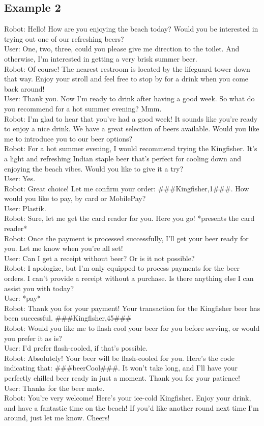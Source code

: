 \documentclass[11pt,a4paper]{article}
\begin{document}
\subsection*{Example 2}
Robot: Hello! How are you enjoying the beach today? Would you be interested in trying out one of our refreshing beers?\\
User: One, two, three, could you please give me direction to the toilet. And otherwise, I'm interested in getting a very brisk summer beer.\\
Robot: Of course! The nearest restroom is located by the lifeguard tower down that way. Enjoy your stroll and feel free to stop by for a drink when you come back around!\\
User: Thank you. Now I'm ready to drink after having a good week. So what do you recommend for a hot summer evening? Mmm.\\
Robot: I'm glad to hear that you've had a good week! It sounds like you're ready to enjoy a nice drink. We have a great selection of beers available. Would you like me to introduce you to our beer options?\\
Robot: For a hot summer evening, I would recommend trying the Kingfisher. It's a light and refreshing Indian staple beer that's perfect for cooling down and enjoying the beach vibes. Would you like to give it a try?\\
User: Yes.\\
Robot: Great choice! Let me confirm your order: \#\#\#Kingfisher,1\#\#\#. How would you like to pay, by card or MobilePay?\\
User: Plastik.\\
Robot: Sure, let me get the card reader for you. Here you go! *presents the card reader*\\
Robot: Once the payment is processed successfully, I'll get your beer ready for you. Let me know when you're all set!\\
User: Can I get a receipt without beer? Or is it not possible?\\
Robot: I apologize, but I'm only equipped to process payments for the beer orders. I can't provide a receipt without a purchase. Is there anything else I can assist you with today?\\
User: *pay*\\
Robot: Thank you for your payment! Your transaction for the Kingfisher beer has been successful. \#\#\#Kingfisher,45\#\#\#\\
Robot: Would you like me to flash cool your beer for you before serving, or would you prefer it as is?\\
User: I'd prefer flash-cooled, if that's possible.\\
Robot: Absolutely! Your beer will be flash-cooled for you. Here's the code indicating that: \#\#\#beerCool\#\#\#. It won't take long, and I'll have your perfectly chilled beer ready in just a moment. Thank you for your patience!\\
User: Thanks for the beer mate.\\
Robot: You're very welcome! Here's your ice-cold Kingfisher. Enjoy your drink, and have a fantastic time on the beach! If you'd like another round next time I'm around, just let me know. Cheers!
\end{document}
